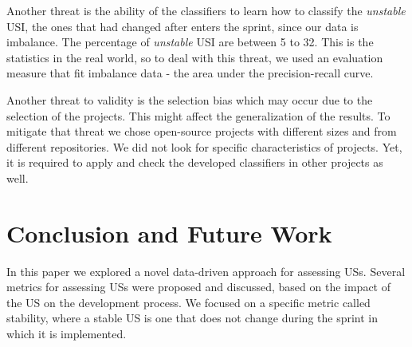 Another threat is the ability of the classifiers to learn how to classify the \emph{unstable} USI, the ones that had changed after enters the sprint, since our data is imbalance. The percentage of \emph{unstable} USI are between 5 to 32. This is the statistics in the real world, so to deal with this threat, we used an evaluation measure that fit imbalance data - the area under the precision-recall curve. 

Another threat to validity is the selection bias which may occur due to the selection of the projects. This might affect the generalization of the results. To mitigate that threat we chose open-source projects with different sizes and from different repositories. We did not look for specific characteristics of projects. %
Yet, it is required to apply and check the developed classifiers in other projects as well.


 



\section{Conclusion and Future Work}
\label{sec-conclsion}

In this paper we explored a novel data-driven approach for assessing USs. Several metrics for assessing USs were proposed and discussed, based on the impact of the US on the development process. We focused on a specific metric called stability, where a stable US is one that does not change during the sprint in which it is implemented. 

